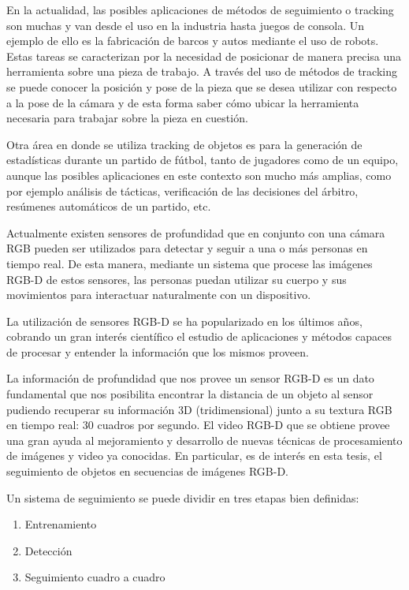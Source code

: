 
En la actualidad, las posibles aplicaciones de métodos de seguimiento o tracking son muchas y van desde el uso en la industria hasta juegos de consola. Un ejemplo de ello es la fabricación de barcos y autos mediante el uso de robots. Estas tareas se caracterizan por la necesidad de posicionar de manera precisa una herramienta sobre una pieza de trabajo. A través del uso de métodos de tracking se puede conocer la posición y pose de la pieza que se desea utilizar con respecto a la pose de la cámara y de esta forma saber cómo ubicar la herramienta necesaria para trabajar sobre la pieza en cuestión.

Otra área en donde se utiliza tracking de objetos es para la generación de estadísticas durante un partido de fútbol, tanto de jugadores como de un equipo, aunque las posibles aplicaciones en este contexto son mucho más amplias, como por ejemplo análisis de tácticas, verificación de las decisiones del árbitro, resúmenes automáticos de un partido, etc.

Actualmente existen sensores de profundidad que en conjunto con una cámara RGB pueden ser utilizados para detectar y seguir a una o más personas en tiempo real. De esta manera, mediante un sistema que procese las imágenes RGB-D de estos sensores, las personas puedan utilizar su cuerpo y sus movimientos para interactuar naturalmente con un dispositivo.

La utilización de sensores RGB-D se ha popularizado en los últimos años, cobrando un gran interés científico el estudio de aplicaciones y métodos capaces de procesar y entender la información que los mismos proveen.

La información de profundidad que nos provee un sensor RGB-D es un dato fundamental que nos posibilita encontrar la distancia de un objeto al sensor pudiendo recuperar su información 3D (tridimensional) junto a su textura RGB en tiempo real: 30 cuadros por segundo.
El video RGB-D que se obtiene provee una gran ayuda al mejoramiento y desarrollo de nuevas técnicas de procesamiento de imágenes y video ya conocidas. En particular, es de interés en esta tesis, el seguimiento de objetos en secuencias de imágenes RGB-D.

Un sistema de seguimiento se puede dividir en tres etapas bien definidas:
\begin{enumerate}
 \item Entrenamiento
 \item Detección
 \item Seguimiento cuadro a cuadro
\end{enumerate}

